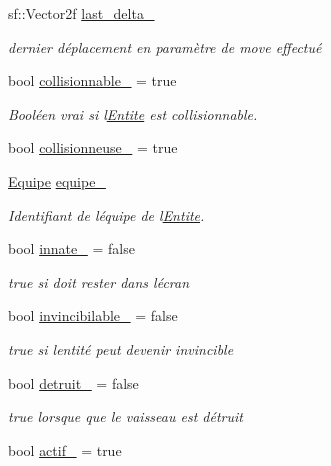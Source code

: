 \begin{DoxyCompactItemize}
sf\+::\+Vector2f \mbox{\hyperlink{class_entite_a39e55c3ccf10d8519e80c7b2a767715a}{last\+\_\+delta\+\_\+}}
\begin{DoxyCompactList}\small\item\em dernier déplacement en paramètre de move effectué \end{DoxyCompactList}\item 
bool \mbox{\hyperlink{class_entite_a2a904f5930310d0b93e527fed9340198}{collisionnable\+\_\+}} = true
\begin{DoxyCompactList}\small\item\em Booléen vrai si l\textquotesingle{}\mbox{\hyperlink{class_entite}{Entite}} est collisionnable. \end{DoxyCompactList}\item 
bool \mbox{\hyperlink{class_entite_a0a347fd96077f1f331ed17247840df06}{collisionneuse\+\_\+}} = true
\item 
\mbox{\hyperlink{constantes_8h_a08fa5554288d5031a8f3bb83cc04ee83}{Equipe}} \mbox{\hyperlink{class_entite_a5fe5eca94bde526873a68163a94011ef}{equipe\+\_\+}}
\begin{DoxyCompactList}\small\item\em Identifiant de l\textquotesingle{}équipe de l\textquotesingle{}\mbox{\hyperlink{class_entite}{Entite}}. \end{DoxyCompactList}\item 
bool \mbox{\hyperlink{class_entite_af590dd6815cafa0748f1adc4da1f3cc2}{innate\+\_\+}} = false
\begin{DoxyCompactList}\small\item\em true si doit rester dans l\textquotesingle{}écran \end{DoxyCompactList}\item 
bool \mbox{\hyperlink{class_entite_a9347adaafb6151a497e4f0feaab14151}{invincibilable\+\_\+}} = false
\begin{DoxyCompactList}\small\item\em true si l\textquotesingle{}entité peut devenir invincible \end{DoxyCompactList}\item 
bool \mbox{\hyperlink{class_entite_a2d98d6fac9fb85da156fcda84fcec3ac}{detruit\+\_\+}} = false
\begin{DoxyCompactList}\small\item\em true lorsque que le vaisseau est détruit \end{DoxyCompactList}\item 
bool \mbox{\hyperlink{class_entite_ac8416aa3acec089b4b0daa818d62fea5}{actif\+\_\+}} = true

\end{DoxyCompactItemize}
